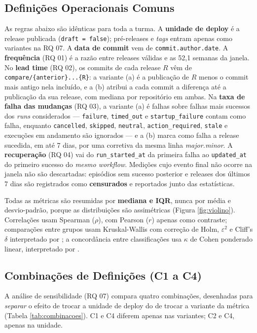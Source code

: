 \subsection{Definições Operacionais Comuns}

As regras abaixo são idênticas para toda a turma. A \textbf{unidade de deploy} é a release
publicada (\texttt{draft = false}); pré-releases e \emph{tags} entram apenas como variantes na
RQ 07. A \textbf{data de commit} vem de \texttt{commit.author.date}. A \textbf{frequência}
(RQ 01) é a razão entre releases válidas e as 52,1 semanas da janela. No \textbf{lead time}
(RQ 02), os commits de cada release $R$ vêm de \texttt{compare/\{anterior\}...\{R\}}: a
variante (a) é a publicação de $R$ menos o commit mais antigo nela incluído, e a (b) atribui a
cada commit a diferença até a publicação da sua release, com mediana por repositório em ambas.
Na \textbf{taxa de falha das mudanças} (RQ 03), a variante (a) é falhas sobre falhas mais sucessos dos \emph{runs}
considerados --- \texttt{failure}, \texttt{timed\_out} e \texttt{startup\_failure} contam como
falha, enquanto \texttt{cancelled}, \texttt{skipped}, \texttt{neutral},
\texttt{action\_required}, \texttt{stale} e execuções em andamento são ignorados --- e a (b)
marca como falha a release sucedida, em até 7 dias, por uma corretiva da mesma linha
\emph{major.minor}. A \textbf{recuperação} (RQ 04) vai do \texttt{run\_started\_at} da
primeira falha ao \texttt{updated\_at} do primeiro sucesso do \emph{mesmo workflow}. Medições
cujo evento final não ocorre na janela não são descartadas: episódios sem sucesso posterior e
releases dos últimos 7 dias são registrados como \textbf{censurados} e reportados junto das
estatísticas.

Todas as métricas são resumidas por \textbf{mediana e IQR}, nunca por média e
desvio-padrão, porque as distribuições são assimétricas (Figura \ref{fig:violino}).
Correlações usam Spearman ($\rho$), com Pearson ($r$) apenas como contraste; comparações
entre grupos usam Kruskal-Wallis com correção de Holm, $\varepsilon^2$ e Cliff's $\delta$
interpretado por ; a concordância entre classificações usa $\kappa$
de Cohen ponderado linear, interpretado por .

\subsection{Combinações de Definições (C1 a C4)}

A análise de sensibilidade (RQ 07) compara quatro combinações, desenhadas para
\emph{separar} o efeito de trocar a unidade de deploy do de trocar a variante da métrica
(Tabela \ref{tab:combinacoes}). C1 e C4 diferem apenas nas variantes; C2 e C4, apenas na
unidade.

